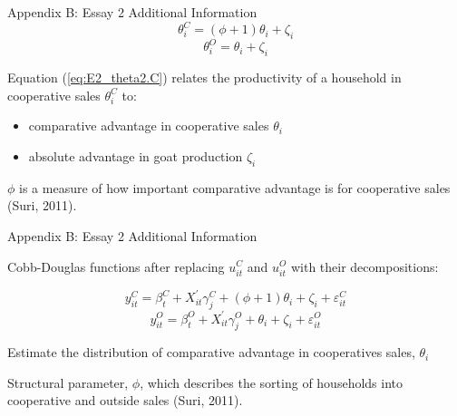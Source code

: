\documentclass[aspectratio=169]{beamer}
\newenvironment{wideitemize}{\itemize\addtolength{\itemsep}{10pt}}{\enditemize}
\begin{document}
\begin{frame}{Appendix B: Essay 2 Additional Information}
    \begin{wideitemize}
    \end{wideitemize}
    \begin{equation} \label{eq:E2_theta2.C}
        \theta^{C}_{i} = (\phi + 1)\theta_{i} + \zeta_i
    \end{equation}
    \begin{equation} \label{eq:E2_theta2.O}
        \theta^{O}_{i} = \theta_{i} + \zeta_i
    \end{equation}
    \begin{wideitemize}
        \item Equation (\ref{eq:E2_theta2.C}) relates the productivity of a household in cooperative sales $\theta^{C}_{i}$ to:
        \begin{itemize}
            \item comparative advantage in cooperative sales $\theta_{i}$
            \item absolute advantage in goat production $\zeta_i$
        \end{itemize} 
        \item $\phi$ is a measure of how important comparative advantage is for cooperative sales (Suri, 2011).
    \end{wideitemize}
\end{frame}

\begin{frame}{Appendix B: Essay 2 Additional Information}
    \begin{wideitemize}
        \item Cobb-Douglas functions after replacing $u^{C}_{it}$ and $u^{O}_{it}$ with their decompositions:

    \begin{equation} \label{eq:E2_y.C}
    y^{C}_{it} = \beta^{C}_{t} + X^{\prime}_{it}\gamma^{C}_{j} + (\phi + 1)\theta_{i} + \zeta_i + \varepsilon^{C}_{it}
    \end{equation}
    \begin{equation} \label{eq:E2_y.O}
    y^{O}_{it} = \beta^{O}_{t} + X^{\prime}_{it}\gamma^{O}_{j} + \theta_{i} + \zeta_i + \varepsilon^{O}_{it}
    \end{equation}
    
        \item Estimate the distribution of comparative advantage in cooperatives sales, $\theta_{i}$
        \item Structural parameter, $\phi$, which describes the sorting of households into cooperative and outside sales (Suri, 2011).

\end{wideitemize}
\end{frame}
\end{document}
